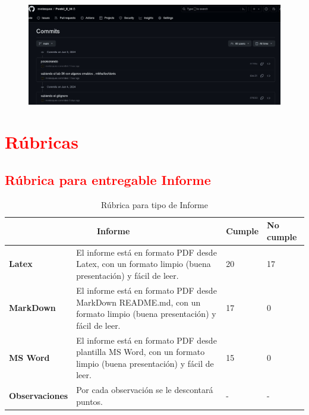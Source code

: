 \documentclass{article}
\begin{document}
	\begin{itemize}
		
		\begin{figure}[H]
			\centering
					\includegraphics[scale=0.3]{img/commits.jpeg} 
		\end{figure}
	\end{itemize}
	\section{\textcolor{red}{Rúbricas}}
	
\subsection{\textcolor{red}{Rúbrica para entregable Informe}}

\begin{table}[H]
    \caption{Rúbrica para tipo de Informe}
    \setlength{\tabcolsep}{0.5em} %
    {\renewcommand{\arraystretch}{1.5}%
    \begin{tabular}{|p{3cm}|p{10cm}|p{2cm}|p{2cm}|}
        \hline
        \multicolumn{2}{|c|}{\textbf{Informe}} & \textbf{Cumple} & \textbf{No cumple} \\
        \hline
        \textbf{Latex} & El informe está en formato PDF desde Latex, con un formato limpio (buena presentación) y fácil de leer. & 20 & 17 \\ 
        \hline
        \textbf{MarkDown} & El informe está en formato PDF desde MarkDown README.md, con un formato limpio (buena presentación) y fácil de leer. & 17 & 0 \\ 
        \hline
        \textbf{MS Word} & El informe está en formato PDF desde plantilla MS Word, con un formato limpio (buena presentación) y fácil de leer. & 15 & 0 \\ 
        \hline
        \textbf{Observaciones} & Por cada observación se le descontará puntos. & - & - \\
        \hline
    \end{tabular}
    }
\end{table}
\end{document}
